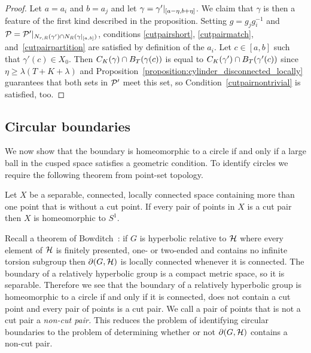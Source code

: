 \begin{proof}
  Let $a = a_i$ and $b = a_j$ and let $\gamma = \gamma'\vert_{[a - \eta, b + \eta]}$. 
  We claim that $\gamma$ is then a feature of the first kind described in the proposition. 
  Setting $g = g_jg_i^{-1}$ and $\mathcal{P} = \mathcal{P}'\vert_{N_{r, R}(\gamma') \cap N_R(\gamma\vert_{[a, b]})}$, conditions \ref{cutpairshort}, \ref{cutpairmatch}, and~\ref{cutpairpartition} are satisfied by definition of the $a_i$. 
  Let $c \in [a, b]$ such that $\gamma'(c) \in X_0$. 
  Then $C_K(\gamma) \cap B_{T}(\gamma(c))$ is equal to $C_K(\gamma') \cap B_{T}(\gamma'(c))$ since $\eta \geq \lambda(T+K+\lambda)$ and Proposition~\ref{proposition:cylinder_disconnected_locally} guarantees that both sets in $\mathcal{P}'$ meet this set, so Condition~\ref{cutpairnontrivial} is satisfied, too.
\end{proof}

\subsection{Circular boundaries}\label{section:detecting_circular_boundaries}

We now show that the boundary is homeomorphic to a circle if and only if a large ball in the cusped space satisfies a geometric condition.
To identify circles we require the following theorem from point-set topology.

\begin{theorem}
  \cite[II.2.13]{wilder49}\label{thm:topologyimpliescircle} 
  Let $X$ be a separable, connected, locally connected space containing more than one point that is without a cut point.
  If every pair of points in $X$ is a cut pair then $X$ is homeomorphic to $S^1$.
\end{theorem}

Recall a theorem of Bowditch~\cite[Theorem 0.1]{bowditch99b}: if $G$ is hyperbolic relative to $\mathcal{H}$ where every element of $\mathcal{H}$ is finitely presented, one-{} or two-ended and contains no infinite torsion subgroup then $\partial(G, \mathcal{H})$ is locally connected whenever it is connected.
The boundary of a relatively hyperbolic group is a compact metric space, so it is separable.
Therefore we see that the boundary of a relatively hyperbolic group is homeomorphic to a circle if and only if it is connected, does not contain a cut point and every pair of points is a cut pair.
We call a pair of points that is not a cut pair a \emph{non-cut pair.}
This reduces the problem of identifying circular boundaries to the problem of determining whether or not $\partial (G, \mathcal{H})$ contains a non-cut pair.

